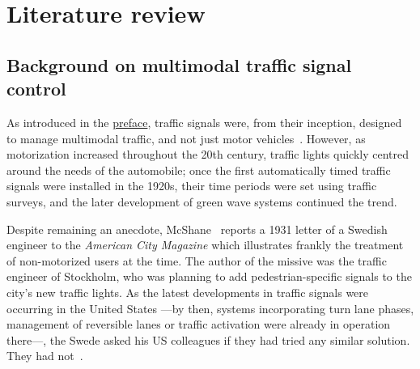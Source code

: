 \section{Literature review} \label{sec:lit_review}



\subsection{Background on multimodal traffic signal control} \label{subsec:bckg_sota}












As introduced in the \hyperref[sec:preface]{preface}, traffic signals were, from their inception, designed to manage multimodal traffic, and not just motor vehicles~\cite{TrafficSignsBranch1999}. However, as motorization increased throughout the 20th century, traffic lights quickly centred around the needs of the automobile; once the first automatically timed traffic signals were installed in the 1920s, their time periods were set using traffic surveys, and the later development of green wave systems continued the trend.~\cite{McShane1999}

Despite remaining an anecdote, McShane~\cite{McShane1999} reports a 1931 letter of a Swedish engineer to the \textit{American City Magazine} which illustrates frankly the treatment of non-motorized users at the time. The author of the missive was the traffic engineer of Stockholm, who was planning to add pedestrian-specific signals to the city's new traffic lights. As the latest developments in traffic signals were occurring in the United States —by then, systems incorporating turn lane phases, management of reversible lanes or traffic activation were already in operation there—, the Swede asked his US colleagues if they had tried any similar solution. They had not~\cite{AC1931}.

